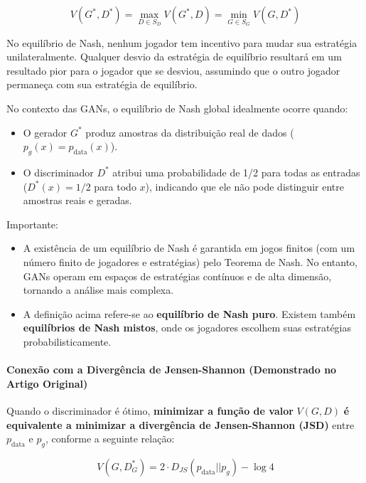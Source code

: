 \documentclass{tufte-handout}
\begin{document}
\begin{equation}
V(G^*, D^*) = \max_{D \in S_D} V(G^*, D) = \min_{G \in S_G} V(G, D^*)
\end{equation}

No equilíbrio de Nash, nenhum jogador tem incentivo para mudar sua estratégia unilateralmente. Qualquer desvio da estratégia de equilíbrio resultará em um resultado pior para o jogador que se desviou, assumindo que o outro jogador permaneça com sua estratégia de equilíbrio.


No contexto das GANs, o equilíbrio de Nash global idealmente ocorre quando:

\begin{itemize}
    \item O gerador $G^*$ produz amostras da distribuição real de dados ($p_g(x) = p_{\text{data}}(x)$).
    \item O discriminador $D^*$ atribui uma probabilidade de 1/2 para todas as entradas ($D^*(x) = 1/2$ para todo $x$), indicando que ele não pode distinguir entre amostras reais e geradas.
\end{itemize} 

Importante:

\begin{itemize}
    \item A existência de um equilíbrio de Nash é garantida em jogos finitos (com um número finito de jogadores e estratégias) pelo Teorema de Nash. No entanto, GANs operam em espaços de estratégias contínuos e de alta dimensão, tornando a análise mais complexa.
    \item A definição acima refere-se ao \textbf{equilíbrio de Nash puro}. Existem também \textbf{equilíbrios de Nash mistos}, onde os jogadores escolhem suas estratégias probabilisticamente.
\end{itemize}
\paragraph{Conexão com a Divergência de Jensen-Shannon (Demonstrado no Artigo Original)}

Quando o discriminador é ótimo, \textbf{minimizar a função de valor} $V(G, D)$ \textbf{é equivalente a minimizar a divergência de Jensen-Shannon (JSD)} entre $p_{\text{data}}$ e $p_g$, conforme a seguinte relação:

\begin{equation}
V(G, D^*_G) = 2 \cdot D_{JS}(p_{\text{data}} || p_g) - \log 4
\end{equation}
\end{document}
